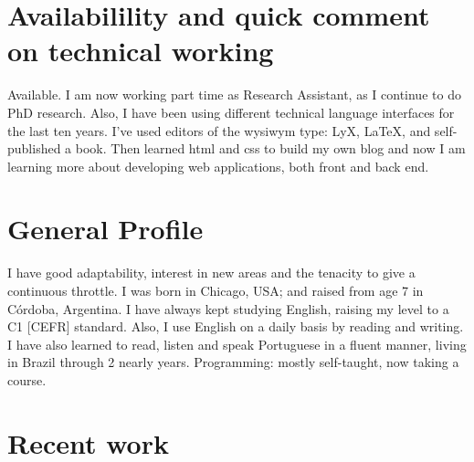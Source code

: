 \documentclass[a4paper,hidelinks]{twentysecondcv} %
\begin{document}
\section{Availabilility and quick comment on technical working}

Available. I am now working part time as Research Assistant, as I continue to do PhD research. 
Also, I have been using different technical language interfaces for the last ten years. 
I've used editors of the wysiwym type: LyX, \LaTeX, and self-published a book. Then learned html and css to build my own blog and now I am learning more about developing web applications, both front and back end.


\section{General Profile}

I have good adaptability, interest in new areas and the tenacity to give a continuous throttle. I was born in Chicago, USA; and raised from age 7 in Córdoba, Argentina. 
I have always kept %
studying %
English, raising my level to a C1 [CEFR] standard. Also, I use English on a  daily basis by reading and writing. I have also learned to read, listen and speak Portuguese in a fluent manner, living in Brazil through 2 nearly years. Programming: mostly self-taught, now taking a course.

\section{Recent work}

\begin{twentyshort} %
\end{twentyshort}
\end{document}
